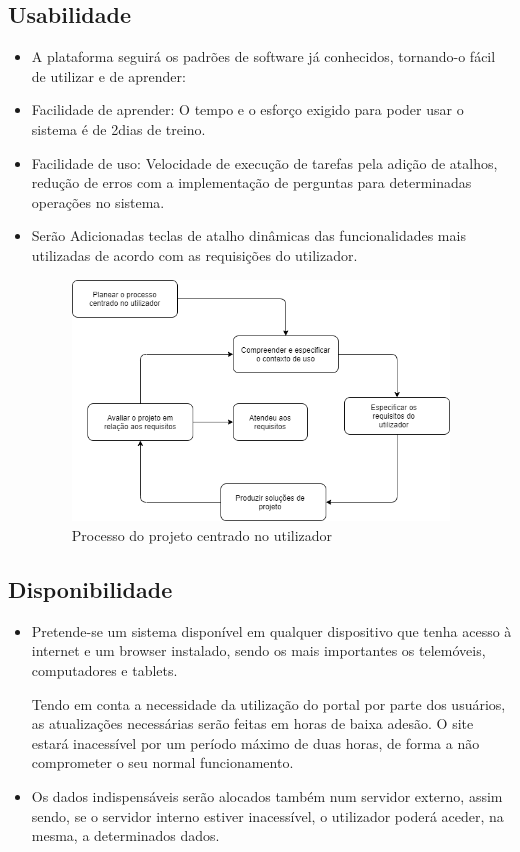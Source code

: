 \subsection{Usabilidade}
\begin{itemize}
    \item A plataforma seguirá os padrões de software já conhecidos, tornando-o fácil de utilizar e de aprender:
    \item Facilidade de aprender: O tempo e o esforço exigido para poder usar o sistema é de 2dias de treino.
    \item Facilidade de uso: Velocidade de execução de tarefas pela adição de atalhos, redução de erros com a implementação de perguntas para determinadas operações no sistema.
    \item Serão Adicionadas teclas de atalho dinâmicas das funcionalidades mais utilizadas de acordo com as requisições do utilizador.
    \begin{figure}[!h]
\centering
\includegraphics[width=10cm]{Figuras/Usabilidade.png}
\caption{Processo do projeto centrado no utilizador}
\label{d.componentes}
\end{figure}
\end{itemize}
\newpage
\subsection{Disponibilidade}
\begin{itemize}
    \item Pretende-se um sistema disponível em qualquer dispositivo que tenha acesso à internet e um browser instalado, sendo os mais importantes os telemóveis, computadores e tablets.

    \itemr Tendo em conta a necessidade da utilização do portal por parte dos usuários, as atualizações necessárias serão feitas em horas de baixa adesão. O site estará inacessível por um período máximo de duas horas, de forma a não comprometer o seu normal funcionamento.

    \item	Os dados indispensáveis serão alocados também num servidor externo, assim sendo, se o servidor interno estiver inacessível, o utilizador poderá aceder, na mesma, a determinados dados. 
\end{itemize}


